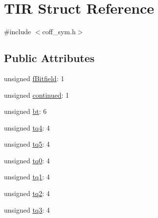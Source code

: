 \hypertarget{structTIR}{
\section{TIR Struct Reference}
\label{structTIR}
}


{\ttfamily \#include $<$coff\_\-sym.h$>$}

\subsection*{Public Attributes}
\begin{DoxyCompactItemize}
\item 
unsigned \hyperlink{structTIR_aa92bf19c08437139a11dbe3436587a74}{fBitfield}: 1
\item 
unsigned \hyperlink{structTIR_a4d6a133fb98ff66d15f737f87bf45eb0}{continued}: 1
\item 
unsigned \hyperlink{structTIR_a4a7ec3b318275cd160bbe6064c35bc6f}{bt}: 6
\item 
unsigned \hyperlink{structTIR_a7d0bbdc22424c97b19a7b31bd032df33}{tq4}: 4
\item 
unsigned \hyperlink{structTIR_a339261bf84849dee1a8e64b31c6e6991}{tq5}: 4
\item 
unsigned \hyperlink{structTIR_a7b3545f6bed24d43c250f7dbe1648d31}{tq0}: 4
\item 
unsigned \hyperlink{structTIR_a54618e58aed8bc06dae46c61cdd631d3}{tq1}: 4
\item 
unsigned \hyperlink{structTIR_a4ffe0f8d8f19acd1643350c2a7e21e95}{tq2}: 4
\item 
unsigned \hyperlink{structTIR_a4dd400d0019e055a1da486ee4aa72200}{tq3}: 4
\end{DoxyCompactItemize}


